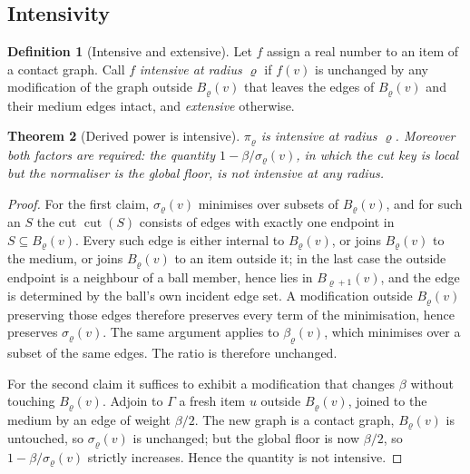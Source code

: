 \documentclass[11pt,twocolumn,a4paper]{article}
\theoremstyle{plain}
\newtheorem{theorem}{Theorem}[section]
\theoremstyle{definition}
\newtheorem{definition}[theorem]{Definition}
\theoremstyle{remark}
\newcommand{\Gph}{\Gamma}
\newcommand{\cut}{\operatorname{cut}}
\newcommand{\flo}{\beta}
\newcommand{\sepc}{\sigma}
\newcommand{\pow}{\pi}
\newcommand{\rad}{\varrho}
\begin{document}
\subsection{Intensivity}

\begin{definition}[Intensive and extensive]
\label{def:intext}
Let $f$ assign a real number to an item of a contact graph. Call $f$
\emph{intensive at radius $\rad$} if $f(v)$ is unchanged by any modification of
the graph outside $B_\rad(v)$ that leaves the edges of $B_\rad(v)$ and their
medium edges intact, and \emph{extensive} otherwise.
\end{definition}

\begin{theorem}[Derived power is intensive]
\label{thm:intensive}
$\pow_\rad$ is intensive at radius $\rad$. Moreover both factors are required:
the quantity $1-\flo/\sepc_\rad(v)$, in which the cut key is local but the
normaliser is the global floor, is \emph{not} intensive at any radius.
\end{theorem}

\begin{proof}
For the first claim, $\sepc_\rad(v)$ minimises over subsets of $B_\rad(v)$, and
for such an $S$ the cut $\cut(S)$ consists of edges with exactly one endpoint
in $S\subseteq B_\rad(v)$. Every such edge is either internal to $B_\rad(v)$,
or joins $B_\rad(v)$ to the medium, or joins $B_\rad(v)$ to an item outside it;
in the last case the outside endpoint is a neighbour of a ball member, hence
lies in $B_{\rad+1}(v)$, and the edge is determined by the ball's own incident
edge set. A modification outside $B_\rad(v)$ preserving those edges therefore
preserves every term of the minimisation, hence preserves $\sepc_\rad(v)$. The
same argument applies to $\flo_\rad(v)$, which minimises over a subset of the
same edges. The ratio is therefore unchanged.

For the second claim it suffices to exhibit a modification that changes $\flo$
without touching $B_\rad(v)$. Adjoin to $\Gph$ a fresh item $u$ outside
$B_\rad(v)$, joined to the medium by an edge of weight $\flo/2$. The new graph
is a contact graph, $B_\rad(v)$ is untouched, so $\sepc_\rad(v)$ is unchanged;
but the global floor is now $\flo/2$, so $1-\flo/\sepc_\rad(v)$ strictly
increases. Hence the quantity is not intensive.
\end{proof}
\end{document}
